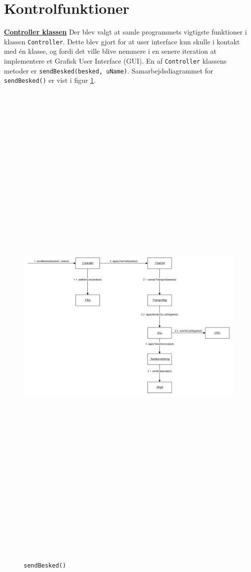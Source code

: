 \section{Kontrolfunktioner}
\underline{\textbf{Controller klassen}}
\newline
Der blev valgt at samle programmets vigtigste funktioner i klassen \texttt{Controller}. Dette blev gjort for at user interface kun skulle i kontakt med én klasse, og fordi det ville blive nemmere i en senere iteration at implementere et Grafisk User Interface (GUI).
\newline
En af \texttt{Controller} klassens metoder er \texttt{sendBesked(besked, uName)}. Samarbejdsdiagrammet for \texttt{sendBesked()} er vist i figur \ref{fig:sendb}.
\begin{figure}[ht]
	\centering
	\includegraphics[width=15cm,height=25cm,keepaspectratio]{pictures/SDsend.png}
	\caption{\texttt{sendBesked()}}
	\label{fig:sendb}
\end{figure}
